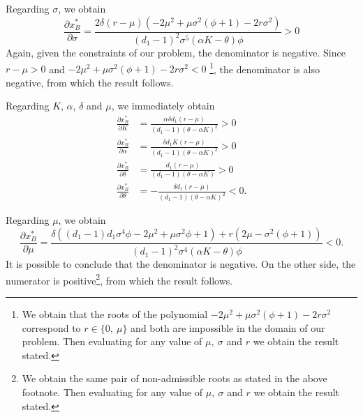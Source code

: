 
Regarding $\sigma$, we obtain
\begin{equation}
\frac{\partial x^*_B}{\partial \sigma}=\frac{2 \delta  (r-\mu) \left(-2 \mu ^2+\mu  \sigma ^2 \left(\phi+1\right)-2 r \sigma ^2\right)}{(d_1-1)^2 \sigma ^5 (\alpha  K-\theta ) \phi}>0
\label{1_xBs}
\end{equation}
Again, given the constraints of our problem, the denominator is negative.
Since $r-\mu>0$ and $-2 \mu ^2+\mu  \sigma ^2 \left(\phi+1\right)-2 r \sigma ^2<0$
\footnote{We obtain that the roots of the polynomial $-2 \mu ^2+\mu  \sigma ^2 \left(\phi+1\right)-2 r \sigma ^2$ correspond to $r \in \{0, \ \mu \}$ and both are impossible in the domain of our problem. Then evaluating for any value of $\mu, \ \sigma$ and $r$ we obtain the result stated.}, the denominator is also negative, from which the result follows.




Regarding $K$, $\alpha$, $\delta$ and $\mu$, we  immediately obtain
\begin{align*}
\frac{\partial x^*_B}{\partial K}&=\frac{\alpha  \delta  d_1 (r-\mu )}{(d_1-1) (\theta -\alpha  K)^2}>0\\
\frac{\partial x^*_B}{\partial \alpha}&=\frac{\delta  d_1 K (r-\mu )}{(d_1-1) (\theta -\alpha K)^2}>0\\
\frac{\partial x^*_B}{\partial \delta}&=\frac{d_1 (r-\mu )}{(d_1-1) (\theta -\alpha  K)}>0\\
\frac{\partial x^*_B}{\partial \theta}&=-\frac{\delta  d_1 (r-\mu )}{(d_1-1) (\theta -\alpha  K)^2}<0.
\end{align*}


Regarding $\mu$, we obtain
$$\frac{\partial x^*_B}{\partial \mu}= \frac{   \delta \left( (d_1-1) d_1 \sigma ^4 \phi -2 \mu ^2+\mu  \sigma ^2 \phi+1 \right)+r \left(2 \mu -\sigma ^2 \left(\phi+1\right)\right)}{(d_1-1)^2 \sigma ^4 (\alpha K-\theta ) \phi}<0.$$
It is possible to conclude that the denominator is negative. On the other side, the numerator is positive\footnote{We obtain the same pair of non-admissible roots as stated in the above footnote. Then evaluating for any value of $\mu, \ \sigma$ and $r$ we obtain the result stated.}, from which the result follows. %
 
